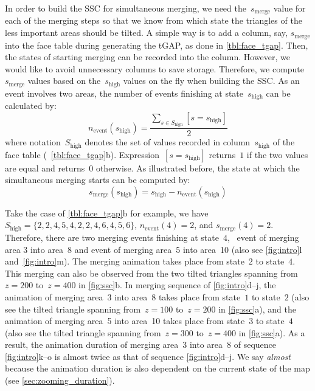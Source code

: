 \documentclass[twocolumn]{svjour3}          %
\begin{document}
In order to build the SSC for simultaneous merging,
we need the~$s_\mathrm{merge}$ value for each of the merging steps
so that we know from which state 
the triangles of the less important areas should be tilted.
A simple way is to add a column, say, $s_\mathrm{merge}$
into the face table during generating the tGAP, 
as done in \tabl\ref{tbl:face_tgap}.
Then, the states of starting merging can be recorded into the column.
However, we would like to avoid unnecessary columns to save storage.
Therefore, we compute~$s_\mathrm{merge}$ values 
based on the~$s_\mathrm{high}$ values
on the fly when building the SSC.
As an event involves two areas,
the number of events finishing at state~$s_\mathrm{high}$ can be calculated by:
\begin{equation}
\label{eq:n_event_state}
n_\mathrm{event} (s_\mathrm{high}) = 
\frac{\sum\limits_{s \in S_\mathrm{high}} [s=s_\mathrm{high}]}{2}
\end{equation}
where notation~$S_\mathrm{high}$ denotes the set of values
recorded in column~$s_\mathrm{high}$ of the face table
(\eg~\tabl\ref{tbl:face_tgap}b).
Expression~$[s=s_\mathrm{high}]$ returns~$1$ if the two values are equal 
and returns~$0$ otherwise.
As illustrated before, the state at which the simultaneous merging starts 
can be computed by:
\begin{equation}
\label{eq:s_merge_state}
s_\mathrm{merge} (s_\mathrm{high}) = s_\mathrm{high} - n_\mathrm{event} (s_\mathrm{high})
\end{equation}



Take the case of \tabl\ref{tbl:face_tgap}b for example,
we have~$S_\mathrm{high} = \{2, 2, 4, 5, 4, 2, 2, 4, 6, 4, 5, 6\}$, 
$n_\mathrm{event} (4) = 2$, and $s_\mathrm{merge} (4) = 2$.
Therefore, there are two merging events finishing at state~$4$,
\ie~event of merging area 3 into area~8 and 
event of merging area~5 into area~10 
(also see \figs\ref{fig:intro}l and~\ref{fig:intro}m).
The merging animation takes place from state~$2$ to state~$4$.
This merging can also be observed from 
the two tilted triangles spanning from~$z = 200$ to~$z = 400$ 
in \fig\ref{fig:ssc}b.
In merging sequence of \figs\ref{fig:intro}d--j, 
the animation of merging area~3 into area~8 
takes place from state~$1$ to state~$2$
(also see the tilted triangle spanning from~$z = 100$ to~$z = 200$ 
in \fig\ref{fig:ssc}a), and 
the animation of merging area~5 into area~10
takes place from state~$3$ to state~$4$
(also see the tilted triangle spanning from~$z = 300$ to~$z = 400$ 
in \fig\ref{fig:ssc}a).
As a result, the animation duration of merging area~3 into area~8 of 
sequence \figs\ref{fig:intro}k--o
is almost twice as that of sequence \figs\ref{fig:intro}d--j.
We say \emph{almost} because the animation duration is also dependent on 
the current state of the map
(see \sect\ref{sec:zooming_duration}).
\end{document}
